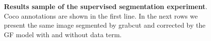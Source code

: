 \documentclass[smallextended]{svjour3}
\begin{document}
\begin{figure}
\caption{\textbf{Results sample of the supervised segmentation experiment}. Coco annotations are shown in the first line. In the next rows we present the same image segmented by grabcut and corrected by the GF model with and without data term.  }
\label{fig:coco-experiment-sample}
\end{figure}
\end{document}
